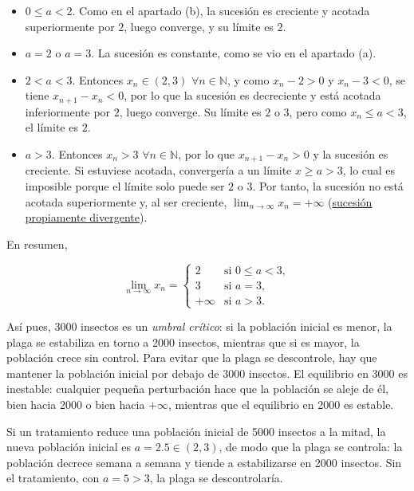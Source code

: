 \documentclass[
  spanish,
  a4paper,
]{scrreport}
\providecommand{\tightlist}{%
  \setlength{\itemsep}{0pt}\setlength{\parskip}{0pt}}
\theoremstyle{definition}
\theoremstyle{remark}
\begin{document}
\begin{tcolorbox}
\begin{enumerate}
  \begin{itemize}
  \tightlist
  \item
    \textbf{\(0\leq a<2\)}. Como en el apartado (b), la sucesión es
    creciente y acotada superiormente por \(2\), luego converge, y su
    límite es \(2\).
  \item
    \textbf{\(a=2\)} o \textbf{\(a=3\)}. La sucesión es constante, como
    se vio en el apartado (a).
  \item
    \textbf{\(2<a<3\)}. Entonces \(x_n\in(2,3)\)
    \(\forall n\in\mathbb{N}\), y como \(x_n-2>0\) y \(x_n-3<0\), se
    tiene \(x_{n+1}-x_n<0\), por lo que la sucesión es decreciente y
    está acotada inferiormente por \(2\), luego converge. Su límite es
    \(2\) o \(3\), pero como \(x_n\leq a<3\), el límite es \(2\).
  \item
    \textbf{\(a>3\)}. Entonces \(x_n>3\) \(\forall n\in\mathbb{N}\), por
    lo que \(x_{n+1}-x_n>0\) y la sucesión es creciente. Si estuviese
    acotada, convergería a un límite \(x\geq a>3\), lo cual es imposible
    porque el límite solo puede ser \(2\) o \(3\). Por tanto, la
    sucesión no está acotada superiormente y, al ser creciente,
    \(\lim_{n\to\infty}x_n = +\infty\)
    (\href{https://aprendeconalf.es/analisis-manual/04-sucesiones.html\#def-sucesiones-propiamente-divergentes}{sucesión
    propiamente divergente}).
  \end{itemize}

  En resumen,

  \[
  \lim_{n\to\infty}x_n = \begin{cases}
  2 & \text{si } 0\leq a<3,\\
  3 & \text{si } a=3,\\
  +\infty & \text{si } a>3.
  \end{cases}
  \]

  Así pues, 3000 insectos es un \emph{umbral crítico}: si la población
  inicial es menor, la plaga se estabiliza en torno a 2000 insectos,
  mientras que si es mayor, la población crece sin control. Para evitar
  que la plaga se descontrole, hay que mantener la población inicial por
  debajo de 3000 insectos. El equilibrio en 3000 es inestable: cualquier
  pequeña perturbación hace que la población se aleje de él, bien hacia
  2000 o bien hacia \(+\infty\), mientras que el equilibrio en 2000 es
  estable.

  Si un tratamiento reduce una población inicial de 5000 insectos a la
  mitad, la nueva población inicial es \(a=2.5\in(2,3)\), de modo que la
  plaga se controla: la población decrece semana a semana y tiende a
  estabilizarse en 2000 insectos. Sin el tratamiento, con \(a=5>3\), la
  plaga se descontrolaría.
\end{enumerate}

\end{tcolorbox}
\end{document}
